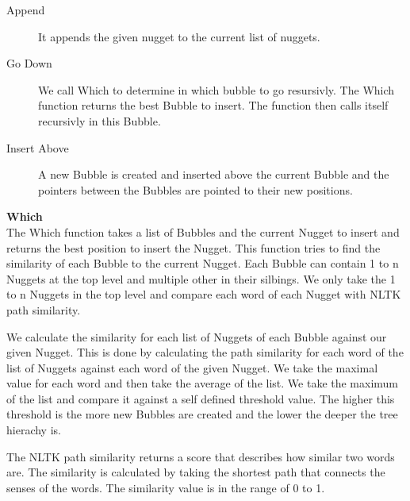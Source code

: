 \begin{description}
\item [Append] It appends the given nugget to the current list of nuggets.
\item [Go Down] We call Which to determine in which bubble to go resursivly. The Which function returns the best Bubble to insert. The function then calls itself recursivly in this Bubble.
\item [Insert Above] A new Bubble is created and inserted above the current Bubble and the pointers between the Bubbles are pointed to their new positions.
\end{description}

\textbf{Which}\\

The Which function takes a list of Bubbles and the current Nugget to insert and returns the best position to insert the Nugget. This function tries to find the similarity of each Bubble to the current Nugget. Each Bubble can contain 1 to n Nuggets at the top level and multiple other in their silbings. We only take the 1 to n Nuggets in the top level and compare each word of each Nugget with NLTK path similarity.


We calculate the similarity for each list of Nuggets of each Bubble against our given Nugget. This is done by calculating the path similarity for each word of the list of Nuggets against each word of the given Nugget. We take the maximal value for each word and then take the average of the list. We take the maximum of the list and compare it against a self defined threshold value. The higher this threshold is the more new Bubbles are created and the lower the deeper the tree hierachy is.

The NLTK path similarity returns a score that describes how similar two words are. The similarity is calculated by taking the shortest path that connects the senses of the words. The similarity value is in the range of 0 to 1.

